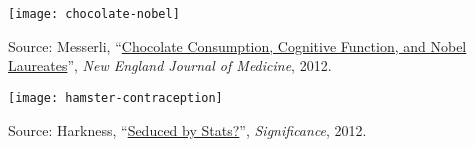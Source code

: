 \documentclass[t]{beamer}
\begin{document}
	
    \begin{frame}[c]

		\begin{center}
			\texttt{[image: chocolate-nobel]}
		\end{center}
		
		\vfill \par Source: Messerli, ``\href{http://www.nejm.org/doi/pdf/10.1056/NEJMon1211064}{Chocolate Consumption, Cognitive Function, and Nobel Laureates}'', \emph{New England Journal of Medicine}, 2012.
		
	\end{frame}

	
	\begin{frame}[c]

		\begin{center}
			\texttt{[image: hamster-contraception]}	
		\end{center}
		
		\vfill \par Source: Harkness, ``\href{http://onlinelibrary.wiley.com/doi/10.1111/j.1740-9713.2012.00549.x/abstract}{Seduced by Stats?}'', \emph{Significance}, 2012.
		
	\end{frame}

\end{document}
